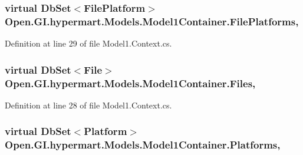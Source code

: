 \subsubsection[{File\+Platforms}]{\setlength{\rightskip}{0pt plus 5cm}virtual Db\+Set$<${\bf File\+Platform}$>$ Open.\+G\+I.\+hypermart.\+Models.\+Model1\+Container.\+File\+Platforms\hspace{0.3cm}{\ttfamily [get]}, {\ttfamily [set]}}\label{class_open_1_1_g_i_1_1hypermart_1_1_models_1_1_model1_container_ad8999f3ba131f3c46c9162b2eff4c7f9}


Definition at line 29 of file Model1.\+Context.\+cs.

\hypertarget{class_open_1_1_g_i_1_1hypermart_1_1_models_1_1_model1_container_a446f391e8b281cf4e3e71f369940189c}{}
\subsubsection[{Files}]{\setlength{\rightskip}{0pt plus 5cm}virtual Db\+Set$<${\bf File}$>$ Open.\+G\+I.\+hypermart.\+Models.\+Model1\+Container.\+Files\hspace{0.3cm}{\ttfamily [get]}, {\ttfamily [set]}}\label{class_open_1_1_g_i_1_1hypermart_1_1_models_1_1_model1_container_a446f391e8b281cf4e3e71f369940189c}


Definition at line 28 of file Model1.\+Context.\+cs.

\hypertarget{class_open_1_1_g_i_1_1hypermart_1_1_models_1_1_model1_container_a47b249679414da9e63797516568ddb73}{}
\subsubsection[{Platforms}]{\setlength{\rightskip}{0pt plus 5cm}virtual Db\+Set$<${\bf Platform}$>$ Open.\+G\+I.\+hypermart.\+Models.\+Model1\+Container.\+Platforms\hspace{0.3cm}{\ttfamily [get]}, {\ttfamily [set]}}\label{class_open_1_1_g_i_1_1hypermart_1_1_models_1_1_model1_container_a47b249679414da9e63797516568ddb73}


